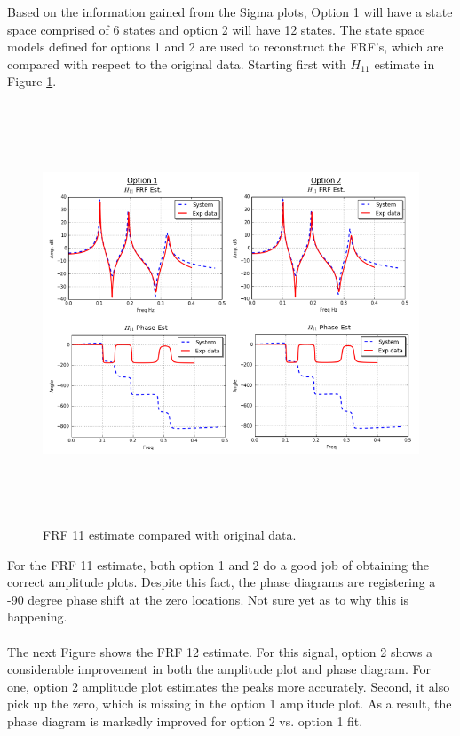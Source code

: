 \documentclass[paper=a4, fontsize=12pt]{scrartcl} %
\begin{document}
%
%
Based on the information gained from the Sigma plots, Option 1 will have a state space comprised of 6 states and option 2 will have 12 states. The state space models defined for options 1 and 2 are used to reconstruct the FRF's, which are compared with respect to the original data. Starting first with $H_{11}$ estimate in Figure \ref{fig:H11EstBoth}.
%
\begin{figure}[H]
	\centering
	\includegraphics[height = 12.5cm]{H11EstBoth.png}
	\caption{FRF 11 estimate compared with original data.}
	\label{fig:H11EstBoth}
\end{figure}
%
For the FRF 11 estimate, both option 1 and 2 do a good job of obtaining the correct amplitude plots. Despite this fact, the phase diagrams are registering a -90 degree phase shift at the zero locations. Not sure yet as to why this is happening.
%
\\
\\
%
The next Figure shows the FRF 12 estimate. For this signal, option 2 shows a considerable improvement in both the amplitude plot and phase diagram. For one, option 2 amplitude plot estimates the peaks more accurately. Second, it also pick up the zero, which is missing in the option 1 amplitude plot. As a result, the phase diagram is markedly improved for option 2 vs. option 1 fit.
%
\end{document}

